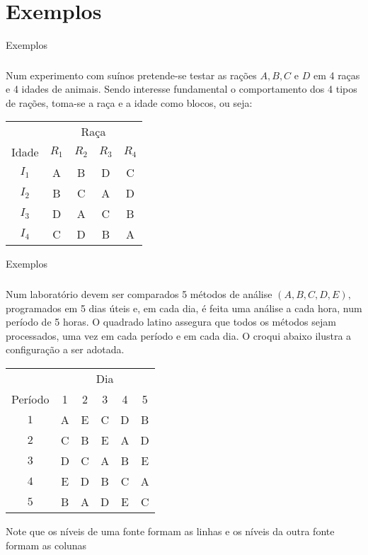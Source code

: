 \documentclass[14pt,aspectratio=1610]{beamer}
\begin{document}
\section{Exemplos}
\begin{frame}{Exemplos}
\frametitle{}
\begin{block}{}
\justifying
Num experimento com suínos pretende-se testar as rações $A,B,C$ e $D$ em 4 raças e 4 idades de animais. Sendo interesse fundamental o comportamento dos 4 tipos de rações, toma-se a raça e a idade como blocos, ou seja:
\begin{table}[!h]
\begin{tabular}{ccccc}
\hline
&\multicolumn{4}{c}{Raça}\\
\cline{2-5}
Idade&$R_{1}$&$R_{2}$&$R_{3}$&$R_{4}$\\
\hline
$I_{1}$&A&B&D&C\\
$I_{2}$&B&C&A&D\\
$I_{3}$&D&A&C&B\\
$I_{4}$&C&D&B&A\\
\hline
\end{tabular}
\end{table}
\end{block}
\end{frame}

\begin{frame}{Exemplos}
\frametitle{}
\begin{block}{}
\justifying
Num laboratório devem ser comparados 5 métodos de análise $(A, B, C, D, E),$ programados em 5 dias úteis e, em cada dia, é feita uma análise a cada hora, num
período de 5 horas. O quadrado latino assegura que todos os métodos sejam
processados, uma vez em cada período e em cada dia. O croqui abaixo ilustra a
configuração a ser adotada.
\vspace{-0.5cm}
\begin{table}[!h]
\begin{tabular}{cccccc}
\hline
&\multicolumn{5}{c}{Dia}\\
\cline{2-6}
Período&1&2&3&4&5\\
\hline
$1$&A&E&C&D&B\\
$2$&C&B&E&A&D\\
$3$&D&C&A&B&E\\
$4$&E&D&B&C&A\\
$5$&B&A&D&E&C\\
\hline
\end{tabular}
\end{table}
\vspace{-0.5cm}
Note que os níveis de uma fonte formam as linhas e os níveis da outra fonte
formam as colunas
\end{block}
\end{frame}
\end{document}

